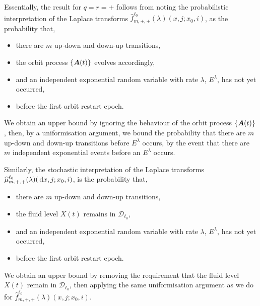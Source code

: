 Essentially, the result for \(q=r=+\) follows from noting the probabilistic interpretation of the Laplace transforms \(\widehat f^{\ell_0}_{m,+,+}(\lambda)(x,j;x_0,i)\), as the probability that, 
\begin{itemize}
	\item there are \(m\) up-down and down-up transitions, 
	\item the orbit process \(\{\boldsymbol A(t)\}\) evolves accordingly, 
	\item and an independent exponential random variable with rate \(\lambda\), \(E^\lambda\), has not yet occurred,
	\item before the first orbit restart epoch.
\end{itemize}
We obtain an upper bound by ignoring the behaviour of the orbit process \(\{\boldsymbol A(t)\}\), then, by a uniformisation argument, we bound the probability that there are \(m\) up-down and down-up transitions before \(E^\lambda\) occurs, by the event that there are \(m\) independent exponential events before an \(E^\lambda\) occurs.

Similarly, the stochastic interpretation of the Laplace transforms \(\widehat \mu^{\ell_0}_{m,+,+}(\lambda)(\, \mathrm{d} x,j;x_0,i)\), is the probability that, 
\begin{itemize}
	\item there are \(m\) up-down and down-up transitions, 
	\item the fluid level \(X(t)\) remains in \(\mathcal D_{\ell_0}\), 
	\item and an independent exponential random variable with rate \(\lambda\), \(E^\lambda\), has not yet occurred,
	\item before the first orbit restart epoch.
\end{itemize}
We obtain an upper bound by removing the requirement that the fluid level \(X(t)\) remain in \(\mathcal D_{\ell_0}\), then applying the same uniformisation argument as we do for \(\widehat f^{\ell_0}_{m,+,+}(\lambda)(x,j;x_0,i)\).

